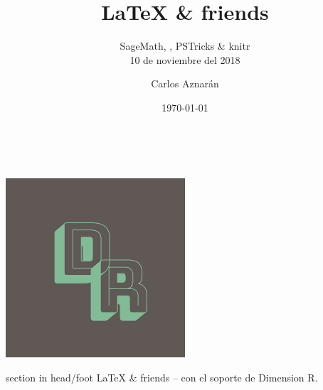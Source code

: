 \documentclass[spanish,9pt]{beamer}
\title[\LaTeX{} \& friends]{\LaTeX{} \& friends}
\subtitle{SageMath, \ararawhite, PSTricks \& knitr\\[\baselineskip]
10 de noviembre del 2018}
\author[Dimension R]{Carlos Aznarán}
\institute[Universidad Nacional de Ingeniería]{Matemáticas\\
Facultad de Ciencias\\
Universidad Nacional de Ingeniería}
\date[\today]{\today}
\begin{document}
\begin{frame}
\titlepage
\end{frame}

\begin{frame}
\frametitle{\contentsname}
\tableofcontents
\end{frame}


%
%
%
%
%

%
%
%
%


\begin{frame}[plain,b]
\centering
\huge \textcolor{white}{¡Gracias por su atención!}
\normalsize
\begin{center}
	\includegraphics[width=0.5\textwidth]{DimensionR}\\
\end{center}
\vspace*{\fill}

\begin{beamercolorbox}[wd=\paperwidth]{section in head/foot}
	\centering\large
	\LaTeX{} \& friends -- con el soporte de Dimension R.
	\vskip10pt
\end{beamercolorbox}
\end{frame}
\end{document}
